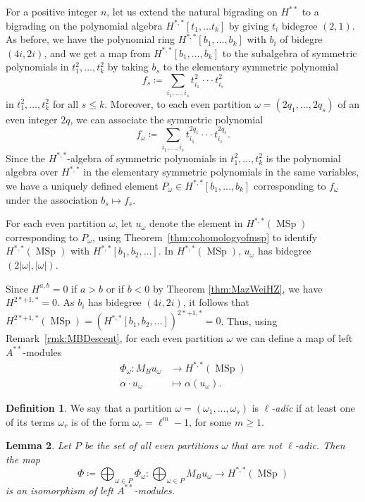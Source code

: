 \documentclass[10pt]{amsart}
\theoremstyle{definition}
\newtheorem{defn}{Definition}[section]
\theoremstyle{plain}
\newtheorem{lemma}[defn]{Lemma}
\numberwithin{equation}{section}
\newcommand{\0}{\emptyset}
\newcommand{\MSp}{{\operatorname{MSp}}}
\begin{document}
For a positive integer $n$, let us extend the natural bigrading on $H^{**}$ to a bigrading on the polynomial algebra $H^{*,*}[t_1,\ldots t_k]$ by giving $t_i$ bidegree $(2,1)$. As before, we have the polynomial ring $H^{*,*}[b_1, \ldots, b_k]$ with $b_i$ of bidegre $(4i,2i)$, and we get a map from $H^{*,*}[b_1, \ldots, b_k]$ to the subalgebra of symmetric polynomials in $t_1^2,\ldots, t_k^2$ by taking $b_s$ to the elementary symmetric polynomial
$$f_s \coloneqq \sum_{i_1,\ldots, i_s}t_{i_1}^2 \cdot \cdot \cdot t_{i_s}^2$$ 
in $t_1^2,\ldots, t_k^2$ for all $s \leq k$. Moreover, to each even partition $\omega=(2q_1,\ldots, 2q_s)$ of an even integer $2q$, we can associate the symmetric polynomial
$$f_{\omega} \coloneqq \sum_{i_1,\ldots, i_s}t_{i_1}^{2q_1} \cdot \cdot \cdot t_{i_s}^{2q_s}.$$
Since the $H^{*,*}$-algebra of symmetric polynomials in $t_1^2,\ldots, t_k^2$ is the polynomial algebra over $H^{*,*}$ in the  elementary symmetric polynomials in the same variables, we have a uniquely defined element $P_\omega\in H^{*,*}[b_1, \ldots, b_k]$ corresponding to $f_\omega$ under the association $b_s \mapsto f_s$.

For each even partition $\omega$, let $u_{\omega}$ denote the element in $H^{*,*}(\MSp)$ corresponding to $P_{\omega}$, using Theorem~\ref{thm:cohomologyofmsp} to identify $H^{*,*}(\MSp)$ with $H^{*,*}[b_1, b_2,\ldots]$. In $H^{*,*}(\MSp)$, $u_{\omega}$ has bidegree $(2 |\omega|, |\omega|)$.

Since $H^{a,b}=0$ if $a>b$ or if $b<0$ by Theorem \ref{thm:MazWeiHZ}, we have $H^{2*+1, *}=0$. As $b_i$ has bidegree $(4i, 2i)$, it follows that $H^{2*+1,*}(\MSp)=(H^{*,*}[b_1, b_2,\ldots])^{2*+1,*}=0$. Thus, using Remark~\ref{rmk:MBDescent}, for each even partition $\omega$ we can define a map of left $A^{**}$-modules
\begin{align*}
    \Phi_{\omega}:M_Bu_{\omega} & \to H^{*,*}(\MSp)\\
    \alpha \cdot u_{\omega} & \mapsto \alpha(u_{\omega}).
\end{align*}

\begin{defn}
\label{defn:l-adicpartition}
    We say that a partition $\omega=(\omega_1, \ldots, \omega_s)$ is \textit{$\ell$-adic} if at least one of its terms $\omega_r$ is of the form $\omega_r=\ell^m-1$, for some $m\ge1$. 
\end{defn}

\begin{lemma}
\label{lemma:decompmsp}
    Let $P$ be the set of all even partitions $\omega$ that are not $\ell$-adic. Then the map
    $$\Phi \coloneqq \bigoplus_{\omega \in P} \Phi_{\omega}:\bigoplus_{\omega \in P}M_Bu_{\omega}\to H^{*,*}(\MSp)$$
    is an isomorphism of left $A^{**}$-modules.
\end{lemma}
\end{document}
